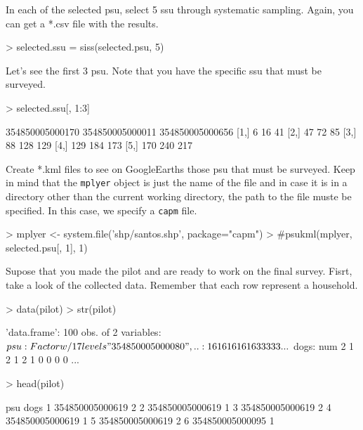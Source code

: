 \documentclass[a4paper]{article}
\begin{document}
In each of the selected psu, select 5 ssu through systematic sampling. Again, you can get a *.csv file with the results.
\begin{Schunk}
\begin{Sinput}
> selected.ssu = siss(selected.psu, 5)
\end{Sinput}
\end{Schunk}

Let's see the first 3 psu. Note that you have the specific ssu that must be surveyed.
\begin{Schunk}
\begin{Sinput}
> selected.ssu[, 1:3]
\end{Sinput}
\begin{Soutput}
     354850005000170 354850005000011 354850005000656
[1,]               6              16              41
[2,]              47              72              85
[3,]              88             128             129
[4,]             129             184             173
[5,]             170             240             217
\end{Soutput}
\end{Schunk}

Create *.kml files to see on GoogleEarths those psu that must be surveyed. Keep in mind that the \texttt{mplyer} object is just the name of the file and in case it is in a directory other than the current working directory, the path to the file muste be specified. In this case, we specify a \texttt{capm} file.
\begin{Schunk}
\begin{Sinput}
> mplyer <- system.file('shp/santos.shp', package="capm")
> #psukml(mplyer, selected.psu[, 1], 1)
\end{Sinput}
\end{Schunk}

Supose that you made the pilot and are ready to work on the final survey. Fisrt, take a look of the collected data. Remember that each row represent a household.
\begin{Schunk}
\begin{Sinput}
> data(pilot)
> str(pilot)
\end{Sinput}
\begin{Soutput}
'data.frame':	100 obs. of  2 variables:
 $ psu : Factor w/ 17 levels "354850005000080",..: 16 16 16 16 16 3 3 3 3 3 ...
 $ dogs: num  2 1 2 1 2 1 0 0 0 0 ...
\end{Soutput}
\begin{Sinput}
> head(pilot)
\end{Sinput}
\begin{Soutput}
              psu dogs
1 354850005000619    2
2 354850005000619    1
3 354850005000619    2
4 354850005000619    1
5 354850005000619    2
6 354850005000095    1
\end{Soutput}
\end{Schunk}
\end{document}
